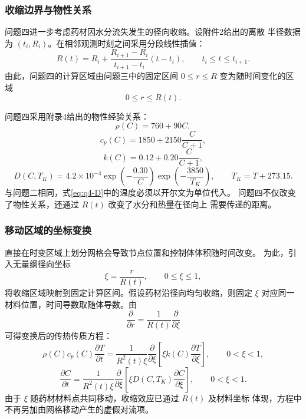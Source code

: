 \documentclass[12pt,a4paper]{article}
\begin{document}
\subsubsection{收缩边界与物性关系}

问题四进一步考虑药材因水分流失发生的径向收缩。设附件2给出的离散
半径数据为 $(t_i,R_i)$。在相邻观测时刻之间采用分段线性插值：
\begin{equation}
R(t)=R_i+
\frac{R_{i+1}-R_i}{t_{i+1}-t_i}(t-t_i),
\qquad t_i\leq t\leq t_{i+1}.
\label{eq:q4-radius}
\end{equation}
由此，问题四的计算区域由问题三中的固定区间 $0\leq r\leq R$
变为随时间变化的区域
\begin{equation}
0\leq r\leq R(t).
\label{eq:q4-moving-domain}
\end{equation}

问题四采用附录4给出的物性经验关系：
\begin{equation}
\rho(C)=760+90C,
\label{eq:q4-rho}
\end{equation}
\begin{equation}
c_p(C)=1850+2150\frac{C}{C+1},
\label{eq:q4-cp}
\end{equation}
\begin{equation}
k(C)=0.12+0.20\frac{C}{C+1},
\label{eq:q4-k}
\end{equation}
\begin{equation}
D(C,T_K)=4.2\times10^{-4}
\exp\left(-\frac{0.30}{C}\right)
\exp\left(-\frac{3850}{T_K}\right),
\qquad T_K=T+273.15.
\label{eq:q4-D}
\end{equation}
与问题二相同，式\eqref{eq:q4-D}中的温度必须以开尔文为单位代入。
问题四不仅改变了物性关系，还通过 $R(t)$ 改变了水分和热量在径向上
需要传递的距离。

\subsubsection{移动区域的坐标变换}

直接在时变区域上划分网格会导致节点位置和控制体体积随时间改变。
为此，引入无量纲径向坐标
\begin{equation}
\xi=\frac{r}{R(t)},\qquad 0\leq\xi\leq1,
\label{eq:q4-coordinate}
\end{equation}
将收缩区域映射到固定计算区间。假设药材沿径向均匀收缩，则固定
$\xi$ 对应同一材料位置，时间导数取随体导数。由
\begin{equation}
\frac{\partial}{\partial r}
=\frac{1}{R(t)}\frac{\partial}{\partial\xi}
\end{equation}
可得变换后的传热传质方程：
\begin{equation}
\rho(C)c_p(C)\frac{\partial T}{\partial t}
=\frac{1}{R^2(t)\xi}
\frac{\partial}{\partial\xi}
\left[\xi k(C)\frac{\partial T}{\partial\xi}\right],
\qquad 0<\xi<1,
\label{eq:q4-heat}
\end{equation}
\begin{equation}
\frac{\partial C}{\partial t}
=\frac{1}{R^2(t)\xi}
\frac{\partial}{\partial\xi}
\left[\xi D(C,T_K)\frac{\partial C}{\partial\xi}\right],
\qquad 0<\xi<1.
\label{eq:q4-moisture}
\end{equation}
由于 $\xi$ 随药材材料点共同移动，收缩效应已通过 $R(t)$ 及材料坐标
体现，方程中不再另加由网格移动产生的虚假对流项。
\end{document}
